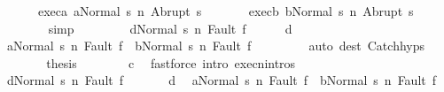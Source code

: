 \begin{isabellebody}
\ \ \ \ \ \ exec{\isacharunderscore}a{}{\isacharcolon}\ {\isachardoublequoteopen}{\isasymGamma}{\isasymturnstile}{\isasymlangle}a{}{\isacharcomma}Normal\ s{\isasymrangle}\ {\isacharequal}n{\isasymRightarrow}\ Abrupt\ s{\isacharprime}{\isachardoublequoteclose}\ \isanewline
\ \ \ \ \ \ exec{\isacharunderscore}b{}{\isacharcolon}\ {\isachardoublequoteopen}{\isasymGamma}{\isasymturnstile}{\isasymlangle}b{}{\isacharcomma}Normal\ s{\isasymrangle}\ {\isacharequal}n{\isasymRightarrow}\ Abrupt\ s{\isacharprime}{\isachardoublequoteclose}\isanewline
\ \ \ \ \ \ \isamarkupfalse%
\ simp\isanewline
\ \ \ \ \isamarkupfalse%
\ \isamarkupfalse%
\ \ {\isachardoublequoteopen}{\isasymGamma}{\isasymturnstile}{\isasymlangle}d{}{\isacharcomma}Normal\ s{\isacharprime}{\isasymrangle}\ {\isacharequal}n{\isasymRightarrow}\ Fault\ f{\isachardoublequoteclose}\isanewline
\ \ \ \ \isamarkupfalse%
\ d{}\ \isanewline
\ \ \ \ \isamarkupfalse%
\ {\isachardoublequoteopen}{\isasymGamma}{\isasymturnstile}{\isasymlangle}a{}{\isacharcomma}Normal\ s{\isacharprime}{\isasymrangle}\ {\isacharequal}n{\isasymRightarrow}\ Fault\ f\ {\isasymor}\ {\isasymGamma}{\isasymturnstile}{\isasymlangle}b{}{\isacharcomma}Normal\ s{\isacharprime}{\isasymrangle}\ {\isacharequal}n{\isasymRightarrow}\ Fault\ f{\isachardoublequoteclose}\ \isanewline
\ \ \ \ \ \ \isamarkupfalse%
\ {\isacharparenleft}auto\ dest{\isacharcolon}\ Catch{\isachardot}hyps{\isacharparenright}\isanewline
\ \ \ \ \isamarkupfalse%
\ \isamarkupfalse%
\ {\isacharquery}thesis\isanewline
\ \ \ \ \ \ \isamarkupfalse%
\ c{}\ \isamarkupfalse%
\ {\isacharparenleft}fastforce\ intro{\isacharcolon}\ execn{\isachardot}intros{\isacharparenright}\isanewline
\ \ \isamarkupfalse%
\isanewline
\ \ \ \ \isamarkupfalse%
\ {\isachardoublequoteopen}{\isasymGamma}{\isasymturnstile}{\isasymlangle}d{}{\isacharcomma}Normal\ s{\isasymrangle}\ {\isacharequal}n{\isasymRightarrow}\ Fault\ f{\isachardoublequoteclose}\ \isanewline
\ \ \ \ \isamarkupfalse%
\ d{}\ \isamarkupfalse%
\ {\isachardoublequoteopen}{\isasymGamma}{\isasymturnstile}{\isasymlangle}a{}{\isacharcomma}Normal\ s{\isasymrangle}\ {\isacharequal}n{\isasymRightarrow}\ Fault\ f\ {\isasymor}\ {\isasymGamma}{\isasymturnstile}{\isasymlangle}b{}{\isacharcomma}Normal\ s{\isasymrangle}\ {\isacharequal}n{\isasymRightarrow}\ Fault\ f{\isachardoublequoteclose}\ \isanewline

\end{isabellebody}
